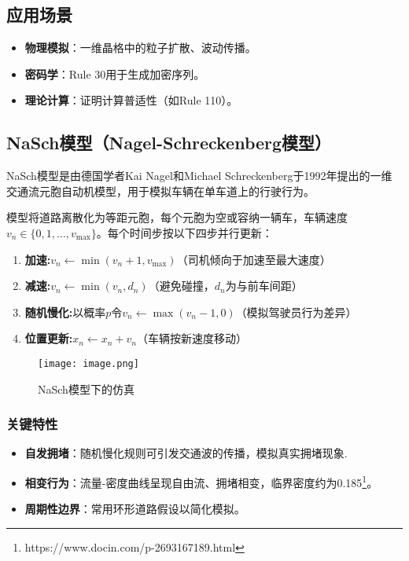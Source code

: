 \documentclass[forprint]{WHUBachelor}
\begin{document}
\subsection{应用场景}
\begin{itemize}
    \item \textbf{物理模拟}：一维晶格中的粒子扩散、波动传播。
    \item \textbf{密码学}：Rule 30用于生成加密序列。
    \item \textbf{理论计算}：证明计算普适性（如Rule 110）。
\end{itemize}



\subsection{NaSch模型（Nagel-Schreckenberg模型）}
NaSch模型是由德国学者Kai Nagel和Michael Schreckenberg于1992年提出的一维交通流元胞自动机模型，用于模拟车辆在单车道上的行驶行为。

模型将道路离散化为等距元胞，每个元胞为空或容纳一辆车，车辆速度$v_n \in \{0,1,\ldots,v_{\max}\}$。每个时间步按以下四步并行更新：
\begin{enumerate}
    \item \textbf{加速:}$v_n \leftarrow \min(v_n + 1, v_{\max})$（司机倾向于加速至最大速度）
    \item \textbf{减速:}$v_n \leftarrow \min(v_n, d_n)$（避免碰撞，$d_n$为与前车间距）
    \item \textbf{随机慢化:}以概率$p$令$v_n \leftarrow \max(v_n - 1, 0)$（模拟驾驶员行为差异）
    \item \textbf{位置更新:}$x_n \leftarrow x_n + v_n$（车辆按新速度移动）
\end{enumerate}
\begin{figure}[h]
    \centering
    \texttt{[image: image.png]}
    \caption{NaSch模型下的仿真}
    \label{fig:gui}
\end{figure}

\subsubsection{关键特性}
\begin{itemize}
    \item \textbf{自发拥堵}：随机慢化规则可引发交通波的传播，模拟真实拥堵现象.%
    \item \textbf{相变行为}：流量-密度曲线呈现自由流、拥堵相变，临界密度约为0.185\footnote{https://www.docin.com/p-2693167189.html}。
    \item \textbf{周期性边界}：常用环形道路假设以简化模拟。
\end{itemize}
\end{document}
